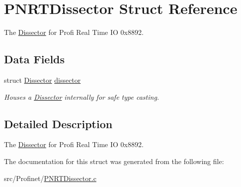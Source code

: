 \hypertarget{struct_p_n_r_t_dissector}{}\section{P\+N\+R\+T\+Dissector Struct Reference}
\label{struct_p_n_r_t_dissector}


The \hyperlink{struct_dissector}{Dissector} for Profi Real Time I\+O 0x8892.  


\subsection*{Data Fields}
\begin{DoxyCompactItemize}
\item 
\hypertarget{struct_p_n_r_t_dissector_a2ec7a75e801e4a714f32310cdf37546f}{}struct \hyperlink{struct_dissector}{Dissector} \hyperlink{struct_p_n_r_t_dissector_a2ec7a75e801e4a714f32310cdf37546f}{dissector}\label{struct_p_n_r_t_dissector_a2ec7a75e801e4a714f32310cdf37546f}

\begin{DoxyCompactList}\small\item\em Houses a \hyperlink{struct_dissector}{Dissector} internally for safe type casting. \end{DoxyCompactList}\end{DoxyCompactItemize}


\subsection{Detailed Description}
The \hyperlink{struct_dissector}{Dissector} for Profi Real Time I\+O 0x8892. 

The documentation for this struct was generated from the following file\+:\begin{DoxyCompactItemize}
\item 
src/\+Profinet/\hyperlink{_p_n_r_t_dissector_8c}{P\+N\+R\+T\+Dissector.\+c}\end{DoxyCompactItemize}
